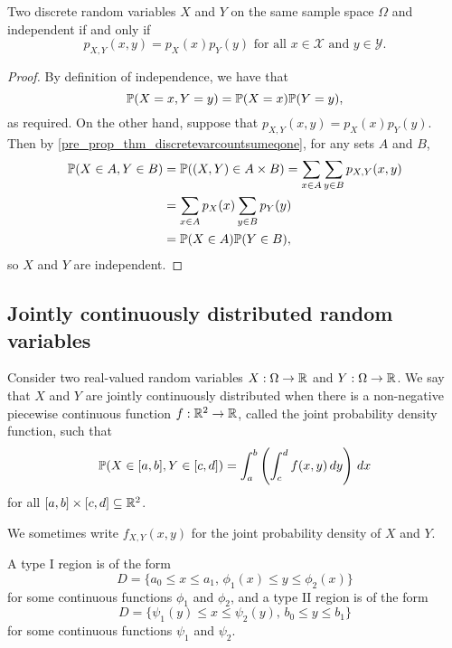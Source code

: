 \documentclass[10pt, a4paper]{article}
\begin{document}
\begin{lemma}
    Two discrete random variables $X$ and $Y$ on the same sample space $\Omega$ and independent if and only if
    \[
    p_{X, Y}(x, y) = p_X(x)p_Y(y)\text{ for all } x \in \mathcal{X}\text{ and } y \in \mathcal{Y}.
    \]
    \begin{proof}
        By definition of independence,
        we have that
        \[
        \P(X = x, Y = y) = \P(X = x)\P(Y = y),
        \]
        as required.
        On the other hand,
        suppose that $p_{X, Y}(x, y) = p_X(x)p_Y(y)$.
        Then by \autoref{pre_prop_thm_discretevarcountsumeqone},
        for any sets $A$ and $B$,
        \begin{align*}
            \P(X \in A, Y \in B) &= \P((X, Y) \in A \times B) = \sum_{x \in A}\sum_{y \in B}p_{X, Y}(x, y) \\
            &= \sum_{x \in A}p_X(x)\sum_{y \in B}p_Y(y) \\
            &= \P(X \in A)\P(Y \in B),
        \end{align*}
        so $X$ and $Y$ are independent.
    \end{proof}
\end{lemma}

\subsection{Jointly continuously distributed random variables}
\begin{definition}
    Consider two real-valued random variables $X : \Omega \rightarrow \R$ and $Y : \Omega \rightarrow \R$.
    We say that $X$ and $Y$ are jointly continuously distributed when there is a non-negative piecewise continuous function $f: \R ^ 2 \rightarrow \R$,
    called the joint probability density function,
    such that
    \[
    \P(X \in [a, b], Y \in [c, d]) = \int_a^b\left(\int_c^d f(x, y)\,dy\right)\,dx
    \]
    for all $[a, b] \times [c, d] \subseteq \R ^ 2$.
\end{definition}

We sometimes write $f_{X, Y}(x, y)$ for the joint probability density of $X$ and $Y$.

A type I region is of the form
\[
D = \{a_0 \leq x \leq a_1,\, \phi_1(x) \leq y \leq \phi_2(x)\}
\]
for some continuous functions $\phi_1$ and $\phi_2$,
and a type II region is of the form
\[
D = \{\psi_1(y) \leq x \leq \psi_2(y),\, b_0 \leq y \leq b_1\}
\]
for some continuous functions $\psi_1$ and $\psi_2$.
\end{document}
